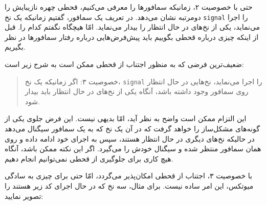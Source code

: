 \documentclass{book}
\begin{document}
    حتی با خصوصیت ۲، زمانیکه سمافورها را معرفی می‌کنیم، قحطی چهره نازیبایش را دومرتبه نشان می‌دهد. 
    در تعریف یک سمافور، گفتیم زمانیکه یک نخ {\tt signal} را اجرا می‌نماید، یکی از نخ‌های در حال انتظار را بیدار می‌نماید. امّا هیچگاه نگفتم کدام را. 
    قبل از اینکه چیزی 
    درباره قحطی بگوییم باید پیش‌فرض‌هایی درباره رفتار سمافورها در نظر بگیریم. 

    ضعیف‌ترین فرضی که به منظور اجتناب از قحطی ممکن است به شرح زیر است:

\begin{quote}
    خصوصیت ۳: اگر زمانیکه یک نخ، {\tt signal} را اجرا می‌نماید، نخ‌هایی در حال انتظار روی سمافور وجود داشته باشد،
    آنگاه یکی از نخ‌های در حال انتظار باید بیدار شود. 
\end{quote}

    این التزام ممکن است واضح به نظر آید، امّا بدیهی نیست. این فرض جلوی یکی از گونه‌های مشکل‌ساز را خواهد گرفت که در آن 
    یک نخ که به یک سمافور سیگنال می‌دهد در حالیکه نخ‌های دیگری در حال انتظار هستند، سپس به اجرای خود ادامه داده و روی همان سمافور منتظر شده و 
    سیگنال خودش را می‌گیرد. اگر این نکته ممکن باشد، آنگاه هیچ کاری برای جلوگیری از قحطی نمی‌توانیم انجام دهیم. 

    با خصوصیت ۳، اجتناب از قحطی امکان‌پذیر می‌گردد، امّا حتی برای چیزی به سادگی میوتکس، این امر ساده نیست. 
    برای مثال، سه نخ که در حال اجرای کد زیر هستند را تصویر نمایید:
    
\end{document}
